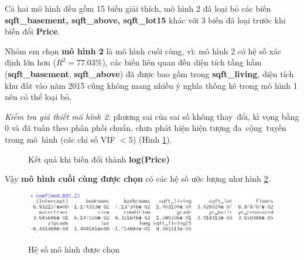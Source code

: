 Cả hai mô hình đều gồm 15 biến giải thích, mô hình 2 đã loại bỏ các biến \textbf{sqft\_basement, sqft\_above, sqft\_lot15} khác với 3 biến đã loại trước khi biến đổi \textbf{Price}. 

Nhóm em chọn \textbf{mô hình 2} là mô hình cuối cùng, vì: mô hình 2 có hệ số xác định lớn hơn ($R^2=77.03\%$), các biến liên quan đến diện tích tầng hầm (\textbf{sqft\_basement}, \textbf{sqft\_above}) đã được bao gồm trong \textbf{sqft\_living}, diện tích khu đất vào năm 2015 cũng không mang nhiều ý nghĩa thống kê trong mô hình 1 nên có thể loại bỏ.

\textit{Kiểm tra giả thiết mô hình 2:} phương sai của sai số không thay~đổi, kì vọng bằng 0 và đã tuân theo phân phối chuẩn, chưa phát hiện hiện tượng đa~cộng~tuyến trong mô~hình (các chỉ số VIF $< 5$) (Hình \ref{B2_final}). 

 \begin{figure}[H]
	\centering
	\hfill
	\caption{Kết quả khi biến đổi thành \textbf{log(Price)}}
	\label{B2_final}
\end{figure}

Vậy \textbf{mô hình cuối cùng được chọn} có các hệ số ước lượng như hình \ref{B2_coef}.
\begin{figure}[H]
	\centering
	{\includegraphics[width=\linewidth]{../Photo Of Result/B2_coef}}
	\caption{Hệ số mô hình được chọn}
	\label{B2_coef}
\end{figure}


